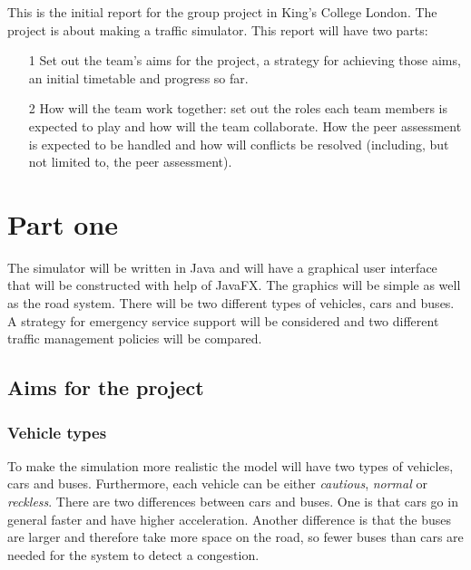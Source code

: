 \documentclass[11pt]{article}
\begin{document}
This is the initial report for the group project in King's College London. The project is about making a traffic simulator. This report will have two parts:

\begin{itemize}
\item[1] Set out the team’s aims for the project, a strategy for achieving those aims, an initial timetable and progress so far.
\item[2] How will the team work together: set out the roles each team members is expected to play and how will the team collaborate. How the peer assessment is expected to be handled and how will conflicts be resolved (including, but not limited to, the peer assessment).
\end{itemize}



\section{Part one}
The simulator will be written in Java and will have a graphical user interface that will be constructed with help of JavaFX. The graphics will be simple as well as the road system. There will be two different types of vehicles, cars and buses. A strategy for emergency service support will be considered and two different traffic management policies will be compared.

\subsection{Aims for the project}

\subsubsection{Vehicle types}
To make the simulation more realistic the model will have two types of vehicles, cars and buses. Furthermore, each vehicle can be either \textit{cautious}, \textit{normal} or \textit{reckless}. There are two differences between cars and buses. One is that cars go in general faster and have higher acceleration. Another difference is that the buses are larger and therefore take more space on the road, so fewer buses than cars are needed for the system to detect a congestion.
\end{document}
